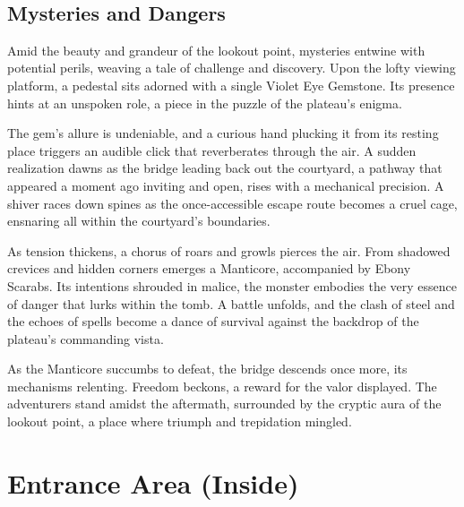 \vfill\eject\hfill\\\vspace*{0.5\fontdimen6\font}
\subsection*{Mysteries and Dangers}
{\entryfont
	Amid the beauty and grandeur of the lookout point, mysteries entwine with potential perils, weaving a tale of challenge and discovery. Upon the lofty viewing platform, a pedestal sits adorned with a single Violet Eye Gemstone. Its presence hints at an unspoken role, a piece in the puzzle of the plateau's enigma.
	
	The gem's allure is undeniable, and a curious hand plucking it from its resting place triggers an audible click that reverberates through the air. A sudden realization dawns as the bridge leading back out the courtyard, a pathway that appeared a moment ago inviting and open, rises with a mechanical precision. A shiver races down spines as the once-accessible escape route becomes a cruel cage, ensnaring all within the courtyard's boundaries.
	
	As tension thickens, a chorus of roars and growls pierces the air. From shadowed crevices and hidden corners emerges a Manticore, accompanied by  Ebony Scarabs. Its intentions shrouded in malice, the monster embodies the very essence of danger that lurks within the tomb. A battle unfolds, and the clash of steel and the echoes of spells become a dance of survival against the backdrop of the plateau's commanding vista.
	
	 As the Manticore succumbs to defeat, the bridge descends once more, its mechanisms relenting. Freedom beckons, a reward for the valor displayed. The adventurers stand amidst the aftermath, surrounded by the cryptic aura of the lookout point, a place where triumph and trepidation mingled.
}

\clearpage

\section*{Entrance Area (Inside)}
